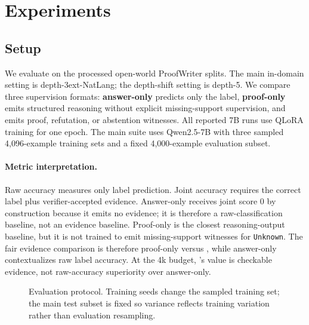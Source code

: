 \section{Experiments}
\label{sec:experiments}

\subsection{Setup}

We evaluate on the processed open-world ProofWriter splits. The main in-domain
setting is depth-3ext-NatLang; the depth-shift setting is depth-5. We compare
three supervision formats: \textbf{answer-only}
predicts only the label, \textbf{proof-only} emits structured reasoning without
explicit missing-support supervision, and \textbf{\model{}} emits proof,
refutation, or abstention witnesses. All reported 7B runs use QLoRA training
for one epoch. The main suite uses Qwen2.5-7B with three sampled 4,096-example
training sets and a fixed 4,000-example evaluation subset.

\paragraph{Metric interpretation.}
Raw accuracy measures only label prediction. Joint accuracy requires the correct
label plus verifier-accepted evidence. Answer-only receives joint score 0 by
construction because it emits no evidence; it is therefore a raw-classification
baseline, not an evidence baseline. Proof-only is the closest reasoning-output
baseline, but it is not trained to emit missing-support witnesses for
\texttt{Unknown}. The fair evidence comparison is therefore proof-only versus
\model{}, while answer-only contextualizes raw label accuracy. At the 4k
budget, \model{}'s value is checkable evidence, not raw-accuracy superiority
over answer-only.

\begin{figure}[t]
\centering
{}
\caption{Evaluation protocol. Training seeds change the sampled training set;
the main test subset is fixed so variance reflects training variation rather
than evaluation resampling.}
\label{fig:protocol}
\end{figure}

